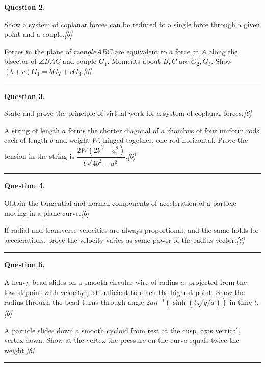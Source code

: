 \documentclass[11pt,a4paper]{article}
\newcommand{\pts}[1]{\hfill   \textit{[#1]}}
\begin{document}
\medskip


\noindent   \textbf{Question 2.}

\begin{parts}
  \item Show a system of coplanar forces can be reduced to a single force through a given point and a couple.\pts{6}
  \item Forces in the plane of $ riangle ABC$ are equivalent to a force at $A$ along the bisector of $\angle BAC$ and couple $G_1$. Moments about $B,C$ are $G_2,G_3$. Show $(b+c)G_1=bG_2+cG_3$.\pts{6}
\end{parts}
\medskip\rule{\linewidth}{0.2pt}

\medskip


\noindent   \textbf{Question 3.}

\begin{parts}
  \item State and prove the principle of virtual work for a system of coplanar forces.\pts{6}
  \item A string of length $a$ forms the shorter diagonal of a rhombus of four uniform rods each of length $b$ and weight $W$, hinged together, one rod horizontal. Prove the tension in the string is $\dfrac{2W(2b^2-a^2)}{b\sqrt{4b^2-a^2}}$.\pts{6}
\end{parts}
\medskip\rule{\linewidth}{0.2pt}

\medskip


\noindent   \textbf{Question 4.}

\begin{parts}
  \item Obtain the tangential and normal components of acceleration of a particle moving in a plane curve.\pts{6}
  \item If radial and transverse velocities are always proportional, and the same holds for accelerations, prove the velocity varies as some power of the radius vector.\pts{6}
\end{parts}
\medskip\rule{\linewidth}{0.2pt}

\medskip


\noindent   \textbf{Question 5.}

\begin{parts}
  \item A heavy bead slides on a smooth circular wire of radius $a$, projected from the lowest point with velocity just sufficient to reach the highest point. Show the radius through the bead turns through angle $2 an^{-1}\!\left(\sinh\!\left(t\sqrt{g/a}\right)\right)$ in time $t$.\pts{6}
  \item A particle slides down a smooth cycloid from rest at the cusp, axis vertical, vertex down. Show at the vertex the pressure on the curve equals twice the weight.\pts{6}
\end{parts}
\medskip\rule{\linewidth}{0.2pt}
\end{document}
